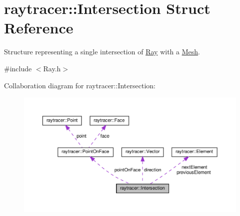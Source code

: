 \hypertarget{structraytracer_1_1Intersection}{}\section{raytracer\+:\+:Intersection Struct Reference}
\label{structraytracer_1_1Intersection}


Structure representing a single intersection of \hyperlink{classraytracer_1_1Ray}{Ray} with a \hyperlink{classraytracer_1_1Mesh}{Mesh}.  




{\ttfamily \#include $<$Ray.\+h$>$}



Collaboration diagram for raytracer\+:\+:Intersection\+:
\nopagebreak
\begin{figure}[H]
\begin{center}
\leavevmode
\includegraphics[width=350pt]{structraytracer_1_1Intersection__coll__graph}
\end{center}
\end{figure}
